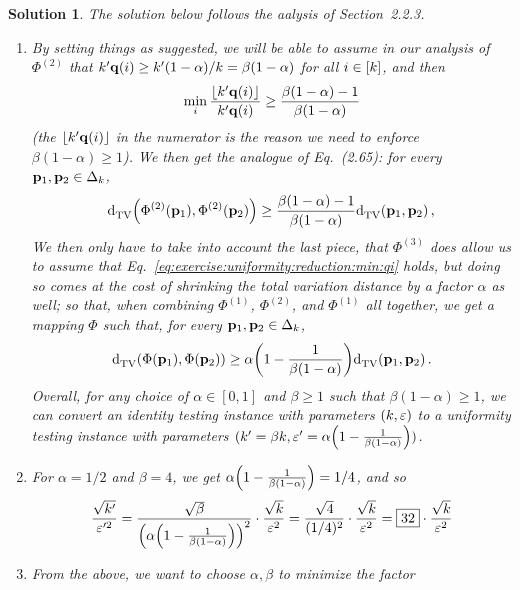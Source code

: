 \documentclass[biber,plain]{nowfnt} %
\newtheorem{solution}{Solution}[chapter]
\begin{document}
\begin{solution} The solution below follows the aalysis of Section~2.2.3.
\begin{enumerate}
  \item By setting things as suggested, we will be able to assume in our analysis of $\Phi^{(2)}$ that $k'\mathbf{q}(i) \geq k'(1-\alpha)/k = \beta(1-\alpha)$ for all $i\in[k]$, and then
  \begin{equation}
  	\label{eq:exercise:uniformity:reduction:min:qi}
  	\min_i \frac{\flr{\ab'\q(i)}}{\ab'\q(i)} \geq \frac{\beta(1-\alpha)-1}{\beta(1-\alpha)}
  \end{equation}
  (the $\flr{\ab'\q(i)}$ in the numerator is the reason we need to enforce $\beta(1-\alpha)\geq 1$). We then get the analogue of Eq.~(2.65): for every $\mathbf{p}_1,\mathbf{p}_2\in\Delta_{k}$, 
  \begin{equation}
  			\totalvardist{\Phi^{(2)}(\p_1)}{\Phi^{(2)}(\p_2)} \geq \frac{\beta(1-\alpha)-1}{\beta(1-\alpha)}\totalvardist{\p_1}{\p_2}\,,
  \end{equation}
  We then only have to take into account the last piece, \ie that $\Phi^{(3)}$ does allow us to assume that Eq.~\eqref{eq:exercise:uniformity:reduction:min:qi} holds, but doing so comes at the cost of shrinking the total variation distance by a factor $\alpha$ as well; so that, when combining $\Phi^{(1)}$, $\Phi^{(2)}$, and $\Phi^{(1)}$ all together, we get a mapping $\Phi$ such that, for every $\mathbf{p}_1,\mathbf{p}_2\in\Delta_{k}$, 
  \begin{equation}
  			\totalvardist{\Phi(\p_1)}{\Phi(\p_2)} \geq \alpha\Paren{1-\frac{1}{\beta(1-\alpha)}}\totalvardist{\p_1}{\p_2}\,.
  \end{equation}
  Overall, for any choice of $\alpha\in[0,1]$ and $\beta \geq 1$ such that $\beta(1-\alpha) \geq 1$, we can convert an identity testing instance with parameters $(k,\varepsilon)$ to a uniformity testing instance with parameters $(\ab' = \beta\ab, \dst' = \alpha\Paren{1-\frac{1}{\beta(1-\alpha)}})$.
  \item For $\alpha = 1/2$ and $\beta=4$, we get $\alpha\Paren{1-\frac{1}{\beta(1-\alpha)}} = 1/4$, and so
  \[
  	\frac{\sqrt{\ab'}}{\dst'^2} 
  	= \frac{\sqrt{\beta}}{\Paren{\alpha\Paren{1-\frac{1}{\beta(1-\alpha)}}}^2}\cdot \frac{\sqrt{\ab}}{\dst^2}  
  	= \frac{\sqrt{4}}{(1/4)^2}\cdot \frac{\sqrt{\ab}}{\dst^2} 
  	= \boxed{32}\cdot \frac{\sqrt{\ab}}{\dst^2}
  \]
  \item From the above, we want to choose $\alpha, \beta$ to minimize the factor
  \begin{equation}

\end{equation}
\end{enumerate}
\end{solution}
\end{document}
